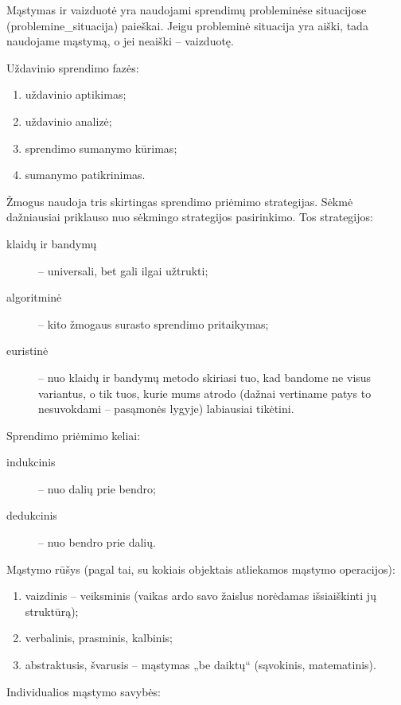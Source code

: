 Mąstymas ir vaizduotė yra naudojami sprendimų probleminėse situacijose
(\gls{problemine_situacija}) paieškai. Jeigu probleminė situacija yra aiški,
tada naudojame mąstymą, o jei neaiški – vaizduotę.

\label{tema:problemu_sprendimas}

Uždavinio sprendimo fazės:
\begin{enumerate}
  \item uždavinio aptikimas;
  \item uždavinio analizė;
  \item sprendimo sumanymo kūrimas;
  \item sumanymo patikrinimas.
\end{enumerate}

Žmogus naudoja tris skirtingas sprendimo priėmimo strategijas. Sėkmė 
dažniausiai priklauso nuo sėkmingo strategijos pasirinkimo. Tos strategijos:
\begin{description}
  \item[klaidų ir bandymų] – universali, bet gali ilgai užtrukti;
  \item[algoritminė] – kito žmogaus surasto sprendimo pritaikymas;
  \item[euristinė] – nuo klaidų ir bandymų metodo skiriasi tuo, kad bandome
    ne visus variantus, o tik tuos, kurie mums atrodo (dažnai vertiname 
    patys to nesuvokdami – pasąmonės lygyje) labiausiai tikėtini.
\end{description}

Sprendimo priėmimo keliai:

\begin{description}
  \item[indukcinis] – nuo dalių prie bendro;
  \item[dedukcinis] – nuo bendro prie dalių.
\end{description}

Mąstymo rūšys (pagal tai, su kokiais objektais atliekamos mąstymo 
operacijos):

\begin{enumerate}
  \item vaizdinis – veiksminis (vaikas ardo savo žaislus norėdamas 
    išsiaiškinti jų struktūrą);
  \item verbalinis, prasminis, kalbinis;
  \item abstraktusis, švarusis – mąstymas „be daiktų“ (sąvokinis, 
    matematinis).
\end{enumerate}

Individualios mąstymo savybės:

